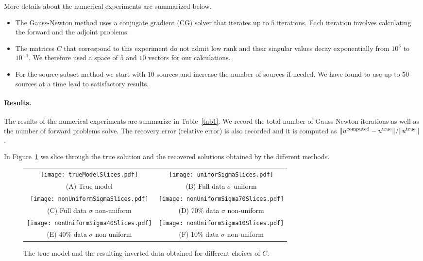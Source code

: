 \documentclass[12pt]{article}
\begin{document}
More details about the numerical experiments are summarized below.
\begin{itemize}
\item The Gauss-Newton method uses a conjugate gradient (CG) solver that iterates up to $5$ iterations. Each iteration involves calculating the forward and the adjoint problems.
\item The matrices $C$ that correspond to this experiment do not admit low rank and their singular values decay exponentially from $10^{3}$ to $10^{-1}$. We therefore used a space of $5$ and $10$ vectors for our calculations.
\item For the source-subset method we start with $10$ sources and increase the number of sources if needed. We have found to use up to $50$ sources at a time lead to satisfactory results.
\end{itemize}
\paragraph{Results.} The results of the numerical experiments are summarize in Table~\ref{tab1}. We record the total number of Gauss-Newton iterations as well as the number of forward problems solve. The recovery error (relative error) is also recorded and it is computed
as $\|u^{\rm computed} - u^{\rm true}\|/ \| u^{\rm true}\|$.

In Figure~\ref{fig2} we slice through the true solution and the recovered solutions obtained by the different methods.
\begin{figure}
\begin{center}
\begin{tabular}{cc}
 \texttt{[image: trueModelSlices.pdf]} &
 \texttt{[image: uniforSigmaSlices.pdf]} \\
(A) True model &  (B) Full data $\sigma$ uniform \\
\texttt{[image: nonUniformSigmaSlices.pdf]} &
\texttt{[image: nonUniformSigma70Slices.pdf]}  \\
(C) Full data $\sigma$ non-uniform &  (D)  70\% data $\sigma$ non-uniform \\
\texttt{[image: nonUniformSigma40Slices.pdf]} &
\texttt{[image: nonUniformSigma10Slices.pdf]}  \\
(E)  40\% data $\sigma$ non-uniform &  (F)  10\% data $\sigma$ non-uniform \\
\end{tabular}
\caption{The true model and the resulting inverted data obtained for different choices of $C$.
\label{fig2}}
\end{center}
\end{figure}
\end{document}
